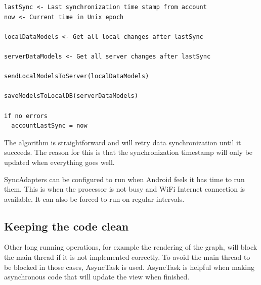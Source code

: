 
\noindent\begin{minipage}{\textwidth}
\begin{lstlisting}[caption={Algorithm for the synchronization flow}, label={fig:algorithm_sync}]
lastSync <- Last synchronization time stamp from account
now <- Current time in Unix epoch

localDataModels <- Get all local changes after lastSync

serverDataModels <- Get all server changes after lastSync

sendLocalModelsToServer(localDataModels)

saveModelsToLocalDB(serverDataModels)

if no errors
  accountLastSync = now
\end{lstlisting}
\end{minipage}

The algorithm is straightforward and will retry data synchronization until it succeeds. The reason for this is that the synchronization timestamp will only be updated when everything goes well. 


SyncAdapters can be configured to run when Android feels it has time to run them. This is when the processor is not busy and WiFi Internet connection is available. It can also be forced to run on regular intervals.

\subsection{Keeping the code clean}
Other long running operations, for example the rendering of the graph, will block the main thread if it is not implemented correctly. To avoid the main thread to be blocked in those cases, AsyncTask is used. AsyncTask is helpful when making asynchronous code that will update the view when finished.


